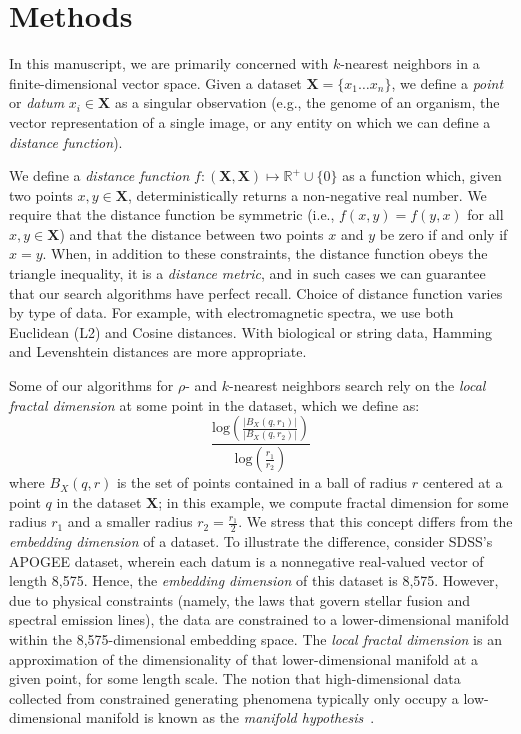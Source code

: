 \section{Methods}
\label{sec:methods}

In this manuscript, we are primarily concerned with $k$-nearest neighbors in a finite-dimensional 
vector space. Given a dataset $\textbf{X} = \{x_1 \dots x_n\}$, we define a \emph{point} or \emph{datum} $x_i \in \textbf{X}$ as a singular observation (e.g., the genome of 
an organism, the vector representation of a single image, or any entity on which we can define a \emph{distance function}).

We define a \emph{distance function} $f : (\textbf{X}, \textbf{X}) \mapsto \mathbb{R}^+ \cup \{0\}$ as a function which, 
given two points $x, y \in \textbf{X}$, deterministically returns a non-negative real number. We require that the distance function 
be symmetric (i.e., $f(x, y) = f(y, x)$ for all $x, y \in \textbf{X}$) and that the distance between two points $x$ and $y$ be zero if and only if $x = y$. 
When, in addition to these constraints, the distance function obeys
the triangle inequality, it is a \emph{distance metric}, and in such cases we can guarantee that our search algorithms have perfect recall. 
Choice of distance function varies by type of data. For example, with electromagnetic spectra, we use both 
Euclidean (L2) and Cosine distances. With biological or string data, Hamming and Levenshtein distances are more appropriate.


Some of our algorithms for $\rho$- and $k$-nearest neighbors search rely on the \emph{local fractal dimension} at some point in the dataset, 
which we define as: 
\begin{equation} \frac{\text{log}(\frac{|B_X(q, r_1)|}{|B_X(q, r_2)|})}{\text{log}(\frac{r_1}{r_2}) } \label{1} \end{equation}
where $B_X(q, r)$ is the set of points contained in a ball of radius $r$ 
centered at a point $q$ in the dataset $\textbf{X}$; in this example, we compute fractal dimension for some radius $r_1$ and a smaller radius $r_2 = \frac{r_1}{2}$.
We stress that this concept differs from the \emph{embedding dimension} of a dataset. To illustrate the difference,
consider SDSS's APOGEE dataset, wherein each datum is a nonnegative real-valued vector of length 8,575. Hence, the \emph{embedding dimension} of this dataset is 8,575. 
However, due to physical constraints (namely, the laws that govern stellar fusion and spectral emission lines), the data are constrained to a lower-dimensional 
manifold within the 8,575-dimensional embedding space. The \emph{local fractal dimension} is an approximation of the dimensionality of that lower-dimensional manifold at a given point, for some length scale.
The notion that high-dimensional data collected from constrained generating phenomena typically only occupy a low-dimensional manifold is known as the \emph{manifold hypothesis}~\cite{fefferman2016testing}.

